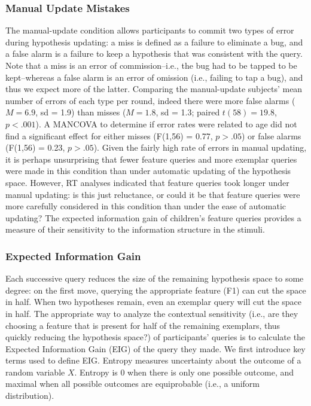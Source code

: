 \documentclass[10pt,letterpaper]{article}
\begin{document}
  \vspace{.05cm}
  

\subsubsection{Manual Update Mistakes}

The manual-update condition allows participants to commit two types of error during 
hypothesis updating: a miss is defined as a failure to eliminate a bug, and a false 
alarm is a failure to keep a hypothesis that was consistent with the query. Note that 
a miss is an error of commission--i.e., the bug had to be tapped to be kept--whereas 
a false alarm is an error of omission (i.e., failing to tap a bug), and thus we expect 
more of the latter. Comparing the manual-update subjects' mean number of errors of 
each type per round, indeed there were more false alarms ($M=6.9$, sd = 1.9) than 
misses ($M=1.8$, sd = 1.3; paired $t(58) = 19.8$, $p<.001$). A MANCOVA to 
determine if error rates were related to age did not find a significant effect for either 
misses (F(1,56) = 0.77, $p>.05$) or false alarms (F(1,56) = 0.23, $p>.05$). Given 
the fairly high rate of errors in manual updating, it is perhaps unsurprising that fewer 
feature queries and more exemplar queries were made in this condition than under 
automatic updating of the hypothesis space. However, RT analyses indicated that 
feature queries took longer under manual updating: is this just reluctance, or could it 
be that feature queries were more carefully considered in this condition than under 
the ease of automatic updating? The expected information gain of children's feature queries provides a measure of their sensitivity to the information structure in the stimuli.

\subsubsection{Expected Information Gain}

Each successive query reduces the size of the remaining hypothesis space to some degree: on the first move, querying the appropriate feature (F1) can cut the space in half. When two hypotheses remain, even an exemplar query will cut the space in half. The appropriate way to analyze the contextual sensitivity (i.e., are they 
choosing a feature that is present for half of the remaining exemplars, thus quickly 
reducing the hypothesis space?) of participants' queries is to calculate the Expected 
Information Gain (EIG) of the query they made. We first introduce key terms used to 
define EIG. Entropy measures uncertainty about the outcome of a random variable 
$X$. Entropy is 0 when there is only one possible outcome, and maximal when all 
possible outcomes are equiprobable (i.e., a uniform distribution).
\end{document}
